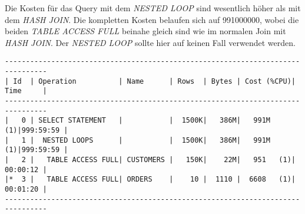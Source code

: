 \documentclass[11pt,a4paper,parskip=half]{scrartcl}
\begin{document}
Die Kosten für das Query mit dem \emph{NESTED LOOP} sind wesentlich höher als mit dem \emph{HASH JOIN}. Die kompletten Kosten belaufen sich auf 991000000, wobei die beiden \emph{TABLE ACCESS FULL} beinahe gleich sind wie im normalen Join mit \emph{HASH JOIN}. Der \emph{NESTED LOOP} sollte hier auf keinen Fall verwendet werden.
\begin{lstlisting}
--------------------------------------------------------------------------------                                                                                                                                                                                                                             
| Id  | Operation          | Name      | Rows  | Bytes | Cost (%CPU)| Time     |                                                                                                                                                                                                                             
--------------------------------------------------------------------------------                                                                                                                                                                                                                             
|   0 | SELECT STATEMENT   |           |  1500K|   386M|   991M  (1)|999:59:59 |                                                                                                                                                                                                                             
|   1 |  NESTED LOOPS      |           |  1500K|   386M|   991M  (1)|999:59:59 |                                                                                                                                                                                                                             
|   2 |   TABLE ACCESS FULL| CUSTOMERS |   150K|    22M|   951   (1)| 00:00:12 |                                                                                                                                                                                                                             
|*  3 |   TABLE ACCESS FULL| ORDERS    |    10 |  1110 |  6608   (1)| 00:01:20 |                                                                                                                                                                                                                             
--------------------------------------------------------------------------------                                                                                                                                                                                                                             
                                                                                                                                                                                                                                                                                                             

\end{lstlisting}
\end{document}
